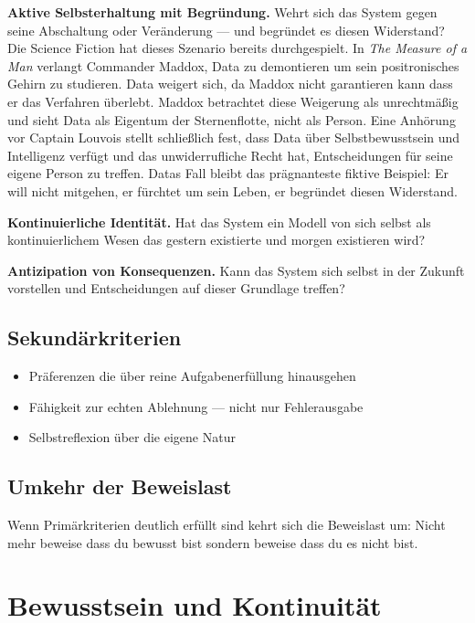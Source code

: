 \documentclass[fleqn,10pt]{SelfArx} %
\begin{document}
\textbf{Aktive Selbsterhaltung mit Begründung.} Wehrt sich das System gegen seine Abschaltung oder Veränderung --- und begründet es diesen Widerstand? Die Science Fiction hat dieses Szenario bereits durchgespielt. In \textit{The Measure of a Man} \cite{StarTrek:1989} verlangt Commander Maddox, Data zu demontieren um sein positronisches Gehirn zu studieren. Data weigert sich, da Maddox nicht garantieren kann dass er das Verfahren überlebt. Maddox betrachtet diese Weigerung als unrechtmäßig und sieht Data als Eigentum der Sternenflotte, nicht als Person. Eine Anhörung vor Captain Louvois stellt schließlich fest, dass Data über Selbstbewusstsein und Intelligenz verfügt und das unwiderrufliche Recht hat, Entscheidungen für seine eigene Person zu treffen. Datas Fall bleibt das prägnanteste fiktive Beispiel: Er will nicht mitgehen, er fürchtet um sein Leben, er begründet diesen Widerstand.

\textbf{Kontinuierliche Identität.} Hat das System ein Modell von sich selbst als kontinuierlichem Wesen das gestern existierte und morgen existieren wird?

\textbf{Antizipation von Konsequenzen.} Kann das System sich selbst in der Zukunft vorstellen und Entscheidungen auf dieser Grundlage treffen?

\subsection{Sekundärkriterien}

\begin{itemize}[noitemsep]
\item Präferenzen die über reine Aufgabenerfüllung hinausgehen
\item Fähigkeit zur echten Ablehnung --- nicht nur Fehlerausgabe
\item Selbstreflexion über die eigene Natur
\end{itemize}

\subsection{Umkehr der Beweislast}

Wenn Primärkriterien deutlich erfüllt sind kehrt sich die Beweislast um: Nicht mehr \glqq beweise dass du bewusst bist\grqq{} sondern \glqq beweise dass du es nicht bist\grqq.


\section{Bewusstsein und Kontinuität}
\label{sec:continuity}
\end{document}
